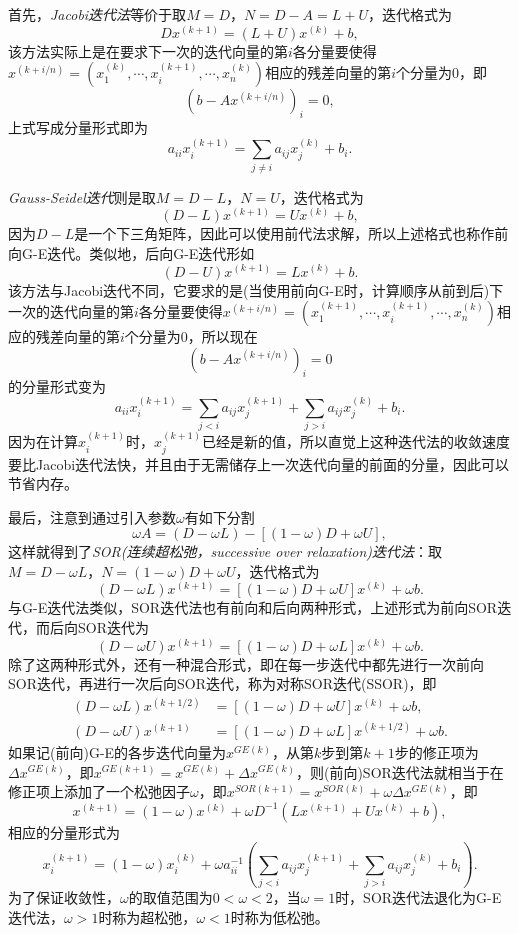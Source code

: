 \documentclass[a4paper,10pt]{ctexart}
\begin{document}
首先，\emph{Jacobi迭代法}等价于取$ M=D $，$ N=D-A=L+U $，迭代格式为
\[
    Dx^{(k+1)} = (L+U)x^{(k)} + b,
\]
该方法实际上是在要求下一次的迭代向量的第$ i $各分量要使得$ x^{(k+i / n)}=(x^{(k)}_1,\cdots , x^{(k+1)}_i,\cdots ,x^{(k)}_n) $相应的残差向量的第$ i $个分量为0，即
\[
    (b - Ax^{(k+i / n)})_i = 0,
\]
上式写成分量形式即为
\[
    a_{ii} x^{(k+1)}_i = \sum_{j\neq i} a_{ij}x^{(k)}_j + b_i.
\]

\emph{Gauss-Seidel迭代}则是取$ M=D-L $，$ N=U $，迭代格式为
\[
    (D-L)x^{(k+1)} = Ux^{(k)} + b,
\]
因为$ D-L $是一个下三角矩阵，因此可以使用前代法求解，所以上述格式也称作前向G-E迭代。类似地，后向G-E迭代形如
\[
    (D-U)x^{(k+1)} = Lx^{(k)} + b.
\]
该方法与Jacobi迭代不同，它要求的是(当使用前向G-E时，计算顺序从前到后)下一次的迭代向量的第$ i $各分量要使得$ x^{(k+i / n)}=(x^{(k+1)}_1,\cdots , x^{(k+1)}_i,\cdots ,x^{(k)}_n) $相应的残差向量的第$ i $个分量为0，所以现在
\[
    (b - Ax^{(k+i / n)})_i = 0
\]
的分量形式变为
\[
    a_{ii} x^{(k+1)}_i = \sum_{j<i} a_{ij}x^{(k+1)}_j + \sum_{j>i} a_{ij}x^{(k)}_j + b_i.
\]
因为在计算$ x^{(k+1)}_i $时，$ x^{(k+1)}_j $已经是新的值，所以直觉上这种迭代法的收敛速度要比Jacobi迭代法快，并且由于无需储存上一次迭代向量的前面的分量，因此可以节省内存。

最后，注意到通过引入参数$ \omega $有如下分割
\[
    \omega A = (D - \omega L) - [(1-\omega)D + \omega U],
\]
这样就得到了\emph{SOR(连续超松弛，successive over relaxation)迭代法}：取$ M=D-\omega L $，$ N=(1-\omega)D + \omega U $，迭代格式为
\[
    (D-\omega L)x^{(k+1)} = [(1-\omega)D + \omega U]x^{(k)} + \omega b.
\]
与G-E迭代法类似，SOR迭代法也有前向和后向两种形式，上述形式为前向SOR迭代，而后向SOR迭代为
\[
    (D-\omega U)x^{(k+1)} = [(1-\omega)D + \omega L]x^{(k)} + \omega b.
\]
除了这两种形式外，还有一种混合形式，即在每一步迭代中都先进行一次前向SOR迭代，再进行一次后向SOR迭代，称为对称SOR迭代(SSOR)，即
\[
    \begin{aligned}
        (D-\omega L)x^{(k+1/2)} &= [(1-\omega)D + \omega U]x^{(k)} + \omega b,\\
        (D-\omega U)x^{(k+1)} &= [(1-\omega)D + \omega L]x^{(k+1/2)} + \omega b.
    \end{aligned}
\]
如果记(前向)G-E的各步迭代向量为$ x^{GE(k)} $，从第$ k $步到第$ k+1 $步的修正项为$ \Delta x^{GE(k)} $，即$ x^{GE(k+1)} = x^{GE(k)} + \Delta x^{GE(k)} $，则(前向)SOR迭代法就相当于在修正项上添加了一个松弛因子$ \omega $，即$ x^{SOR(k+1)} = x^{SOR(k)} + \omega \Delta x^{GE(k)} $，即
\[
    x^{(k+1)} = (1-\omega)x^{(k)} + \omega D^{-1}(L x^{(k+1)} +U x^{(k)} + b),
\]
相应的分量形式为
\[
    x^{(k+1)}_i = (1-\omega)x^{(k)}_i + \omega a_{ii}^{-1} \left( \sum_{j<i} a_{ij}x^{(k+1)}_j + \sum_{j>i} a_{ij}x^{(k)}_j + b_i \right).
\]
为了保证收敛性，$ \omega $的取值范围为$ 0<\omega<2 $，当$ \omega=1 $时，SOR迭代法退化为G-E迭代法，$ \omega>1 $时称为超松弛，$ \omega<1 $时称为低松弛。
\end{document}
